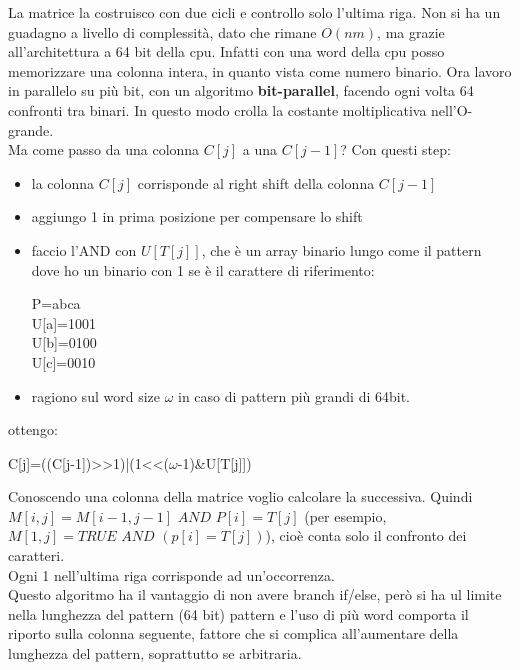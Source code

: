 \documentclass[a4paper,12pt, oneside]{book}
\begin{document}
La matrice la costruisco con due cicli e controllo solo l'ultima riga.
Non si ha un guadagno a livello di complessità, dato che rimane
$O(nm)$, ma grazie all'architettura a 64 bit della cpu. Infatti con una word
della cpu posso memorizzare una colonna intera, in quanto vista come numero
binario. Ora lavoro in parallelo su più bit, con un algoritmo
\textbf{bit-parallel}, facendo ogni volta 64 confronti tra binari. In
questo modo crolla la costante moltiplicativa nell'O-grande.\\
Ma come passo da una colonna $C[j]$ a una $C[j-1]$? Con questi step:
\begin{itemize}
  \item la colonna $C[j]$ corrisponde al right shift della colonna $C[j-1]$
  \item aggiungo 1 in prima posizione per compensare lo shift
  \item faccio l'AND con $U[T[j]]$, che è un array binario lungo come
  il pattern dove ho un binario con 1 se è il carattere  di
  riferimento:
  \begin{center}
    P=abca\\
    U[a]=1001\\
    U[b]=0100\\
    U[c]=0010\\
  \end{center}
  \item ragiono sul word size $\omega$ in caso di pattern più grandi
  di 64bit.
\end{itemize}
ottengo:
\begin{center}
  C[j]=((C[j-1])>>1)|(1<<($\omega$-1)\&U[T[j]])
\end{center}
Conoscendo una colonna della matrice voglio calcolare la successiva. 
Quindi $M[i,j]=M[i-1,j-1]\,\,AND\,\,P[i]=T[j]$ (per esempio, 
$M[1,j]=TRUE\,\,AND\,\,(p[i]=T[j])$), cioè conta solo il
confronto dei caratteri. \\
Ogni 1 nell'ultima riga corrisponde ad un'occorrenza. \\ 
Questo algoritmo ha il vantaggio di non avere branch if/else, 
però si ha ul limite nella lunghezza del pattern (64 bit) pattern 
e l'uso di più word comporta il riporto sulla colonna
seguente, fattore che si complica all'aumentare della lunghezza del
pattern, soprattutto se arbitraria.
\end{document}
